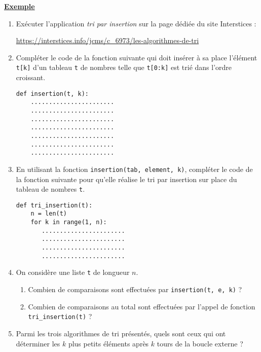 \documentclass[a4paper, french, 12pt]{article}  %
\newcounter{thme}
\newcounter{def}
\newcounter{exple}
\newenvironment{exemple}[1]
{\par \medskip  \noindent \addtocounter{exple}{1} \underline{\textbf{Exemple} \textbf{\theexple} } \hspace{0.5cm}{\itshape #1} \vspace*{10pt} \par}
{\par \medskip }
\newcounter{alg}
\newlength{\parpointille}
\newcommand{\Pointilles}[2]{%
\multido{}{#1}{%
\makebox[#2]{\dotfill}\\[\parpointille]
}}
\begin{document}
\begin{exemple}{Implémentation du tri par insertion}

\begin{enumerate}
\item  Exécuter l'application \textit{tri par insertion} sur la page dédiée du site Interstices :

{\centering  \url{https://interstices.info/jcms/c_6973/les-algorithmes-de-tri}   


}


\item Compléter le code de la fonction suivante qui doit insérer à sa place l'élément  \verb+t[k]+ d'un tableau  \verb+t+ de nombres telle que \lstinline+t[0:k]+ est trié dans l'ordre croissant.


\begin{lstlisting}
def insertion(t, k):   
    .......................
    .......................
    .......................
    ....................... 
    ....................... 
    ....................... 
    ....................... 
\end{lstlisting}

\item En utilisant la fonction \verb+insertion(tab, element, k)+, compléter le code de la fonction suivante pour qu'elle réalise le tri par insertion sur place du tableau de nombres \verb+t+. 


\begin{lstlisting}
def tri_insertion(t):
	n = len(t)
    for k in range(1, n):
       .......................
       .......................
       .......................
       .......................     
\end{lstlisting}

\item On considère une liste \verb+t+ de longueur $n$. 
		\begin{enumerate}
			\item 	Combien de comparaisons sont effectuées par \lstinline+insertion(t, e, k)+   ?
			
			\Pointilles{3}{\linewidth}
			
			\item Combien de comparaisons au total sont effectuées par l'appel de fonction \verb+tri_insertion(t)+ ?
			
			\Pointilles{4}{\linewidth}
			
		\end{enumerate}
		
\item Parmi les trois algorithmes de tri présentés, quels sont ceux qui ont déterminer  les $k$ plus petits éléments après $k$ tours de la boucle externe ?

			\Pointilles{4}{\linewidth}
			
\end{enumerate}
\end{exemple}

 
\end{document}
